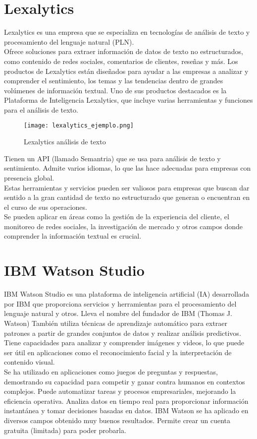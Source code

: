 \section{Lexalytics~\cite{lexalytics}}
Lexalytics es una empresa que se especializa en tecnologías de análisis de texto y 
procesamiento del lenguaje natural (PLN).\\
Ofrece soluciones para extraer información de datos de texto no estructurados, 
como contenido de redes sociales, comentarios de clientes, reseñas y más. 
Los productos de Lexalytics están diseñados para ayudar a las empresas a analizar 
y comprender el sentimiento, los temas y las tendencias dentro de grandes volúmenes de información textual.
Uno de sus productos destacados es la Plataforma de Inteligencia Lexalytics, 
que incluye varias herramientas y funciones para el análisis de texto.
\begin{figure}[h]
    \advance{} 
    \texttt{[image: lexalytics\_ejemplo.png]}
    \caption{Lexalytics análisis de texto}
\end{figure}
Tienen un API (llamado Semantria) que se usa para análisis de texto y sentimiento.
Admite varios idiomas, lo que las hace adecuadas para empresas con presencia global.\\
Estas herramientas y servicios pueden ser valiosos para empresas que 
buscan dar sentido a la gran cantidad de texto no estructurado que generan o 
encuentran en el curso de sus operaciones. \\Se pueden aplicar en áreas como la gestión 
de la experiencia del cliente, el monitoreo de redes sociales, la investigación de mercado 
y otros campos donde comprender la información textual es crucial.


\section{IBM Watson Studio~\cite{ibmwatson}}
IBM Watson Studio es una plataforma de inteligencia artificial (IA) desarrollada 
por IBM que proporciona servicios y herramientas para el procesamiento 
del lenguaje natural y otros. 
Lleva el nombre del fundador de IBM (Thomas J. Watson)
También utiliza técnicas de aprendizaje automático 
para extraer patrones a partir de grandes conjuntos de datos y realizar análisis predictivos.\\
Tiene capacidades para analizar y comprender imágenes y videos, lo que puede 
ser útil en aplicaciones como el reconocimiento facial y la interpretación de contenido visual.\\
Se ha utilizado en aplicaciones como juegos de preguntas y 
respuestas, demostrando su capacidad para competir y ganar contra humanos en contextos complejos.
Puede automatizar tareas y procesos empresariales, mejorando la eficiencia operativa.
Analiza datos en tiempo real para proporcionar información instantánea y tomar decisiones basadas en datos.
IBM Watson se ha aplicado en diversos campos obtenido muy buenos resultados.
Permite crear un cuenta gratuita (limitada) para poder probarla.

